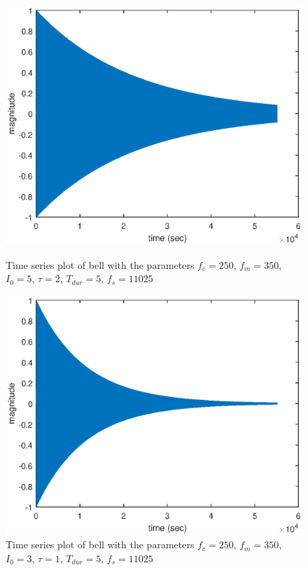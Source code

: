 \documentclass{article}
\begin{document}
\begin{figure}[H]
	\centering
	\begin{minipage}{0.3\linewidth}
		\includegraphics[scale=0.3]{time5}
		\caption{Time series plot of bell with the parameters $f_c = 250$, $f_m = 350$, $I_0 = 5$, $\tau = 2$, $T_{dur} = 5$, $f_s = 11025$}
	\end{minipage}
	\hspace{4cm}
	\begin{minipage}{0.3\linewidth}
		\includegraphics[scale=0.3]{time6}
		\caption{Time series plot of bell with the parameters $f_c = 250$, $f_m = 350$, $I_0 = 3$, $\tau = 1$, $T_{dur} = 5$, $f_s = 11025$}
	\end{minipage}
\end{figure}
\end{document}
